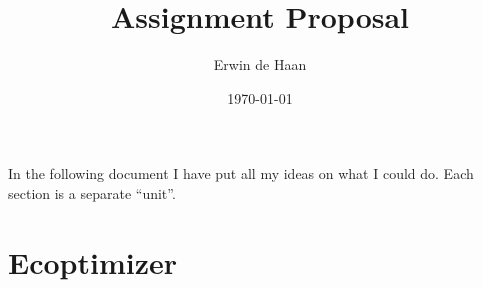 \documentclass[final,a4paper,11pt]{article}
\author{Erwin de Haan}
\title{Assignment Proposal}
\date{\today}
\begin{document}
\maketitle
In the following document I have put all my ideas on what I could do. Each section is a separate ``unit''.

\section{Ecoptimizer}
\end{document}
